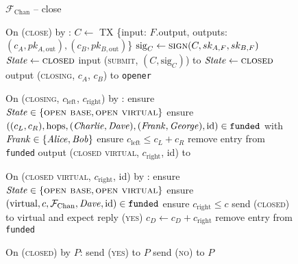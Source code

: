 \begin{figure}[H]
  \begin{systembox}{$\mathcal{F}_{\mathrm{Chan}}$ -- close}
    \begin{algorithmic}[1]
      \State On (\textsc{close}) by \alice:
      \Indent
          \State $C \gets$ TX \{input: $F$.output, outputs: $(c_A, pk_{A,
          \mathrm{out}}), (c_B, pk_{B, \mathrm{out}})$\}
          \State $\mathrm{sig}_C \gets \textsc{sign}(C, sk_{A, F}, sk_{B, F})$
          \State $\mathit{State} \gets \textsc{closed}$
          \State input (\textsc{submit}, $(C, \mathrm{sig}_C)$) to \ledger
          \State $\mathit{State} \gets \textsc{closed}$
          \State output (\textsc{closing}, $c_A$, $c_B$) to \texttt{opener}
        \EndIf
      \EndIndent
      \Statex

      \State On (\textsc{closing}, $c_{\mathrm{left}}$, $c_{\mathrm{right}}$) by
      \fchan:
      \Indent
        \State ensure $\mathit{State} \in \{\textsc{open base}, \textsc{open
        virtual}\}$
        \State ensure $((c_L, c_R), \mathrm{hops}, (\mathit{Charlie}, \mathit{Dave}), (\mathit{Frank},
        \mathit{George}), \mathrm{id}) \in \mathtt{funded}$ with $\mathit{Frank} \in \{\mathit{Alice},
        \mathit{Bob}\}$
        \State ensure $c_{\mathrm{left}} \leq c_L + c_R$
        \State remove entry from \texttt{funded}
        \State output (\textsc{closed virtual}, $c_{\mathrm{right}}$, id) to
        \frank
      \EndIndent
      \Statex

      \State On (\textsc{closed virtual}, $c_{\mathrm{right}}$, id) by \fchan:
      \Indent
        \State ensure $\mathit{State} \in \{\textsc{open base}, \textsc{open
        virtual}\}$
        \State ensure $(\mathrm{virtual}, c, \mathcal{F}_{\mathrm{Chan}}, \mathit{Dave}, \mathrm{id}) \in
        \mathtt{funded}$
        \State ensure $c_{\mathrm{right}} \leq c$
        \State send (\textsc{closed}) to virtual and expect reply (\textsc{yes})
        \State $c_D \gets c_D + c_{\mathrm{right}}$
        \State remove entry from \texttt{funded}
      \EndIndent
      \Statex

      \State On (\textsc{closed}) by $P$:
      \Indent
          \State send (\textsc{yes}) to $P$
        \Else
          \State send (\textsc{no}) to $P$
        \EndIf
      \EndIndent
    \end{algorithmic}
  \end{systembox}
  \caption{}
  \label{code:functionality:chan:skeleton:close}
\end{figure}

